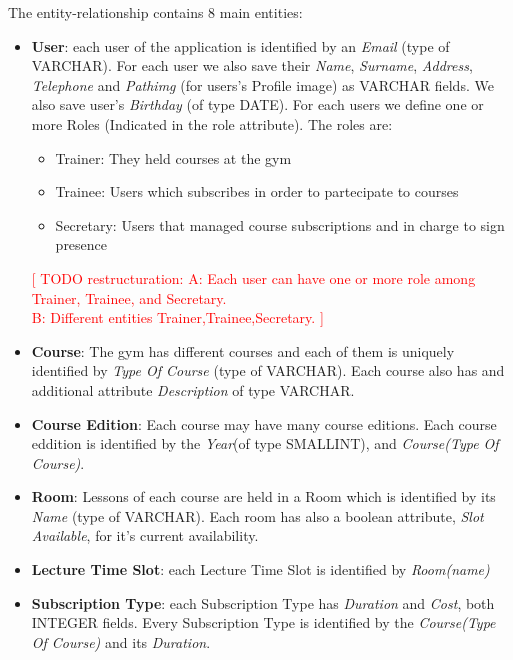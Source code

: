     The entity-relationship contains 8 main entities:
    \begin{itemize}
        \item 
        \textbf{User}: each user of the application is identified by an \textit{Email} (type of VARCHAR). 
    	For each user we also save their \textit{Name}, \textit{Surname}, \textit{Address}, \textit{Telephone} and \textit{Path\textunderscore img} (for users's Profile image) as VARCHAR fields. We also save user's \textit{Birthday} (of type DATE). For each users we define
        one or more Roles (Indicated in the role attribute). The roles are:
        \begin{itemize}
	    \item Trainer: They held courses at the gym 
    	\item Trainee: Users which subscribes in order to partecipate to courses
        \item Secretary: Users that managed course subscriptions and in charge to sign presence
        
        \end{itemize}
    	\textcolor{red}{[ TODO restructuration: A: Each user can have one or more role among Trainer,  Trainee, and Secretary.\\
    	  B: Different entities Trainer,Trainee,Secretary. ]}
    	
    	\item 
    	\textbf{Course}: The gym has different courses and each of them is uniquely identified by 
    	\textit{Type Of Course} (type of VARCHAR). Each course also has and additional attribute \textit{Description} of type VARCHAR.
    	
    	\item 
    	\textbf{Course Edition}: Each course may have many course editions. Each course eddition is identified by the \textit{Year}(of type SMALLINT), and \textit{Course(Type Of Course)}.
    	
    	\item 
    	\textbf{Room}: Lessons of each course are held in a Room which is identified by its \textit{Name} (type of VARCHAR). Each room has also a boolean attribute, \textit{Slot Available}, for it's current availability.
    	
    	\item \textbf{Lecture Time Slot}: each Lecture Time Slot is identified by \textit{Room(name)}
    	
    	\item \textbf{Subscription Type}: each Subscription Type has \textit{Duration} and \textit{Cost}, both INTEGER fields. Every Subscription Type is identified by the \textit{Course(Type Of Course)} and its \textit{Duration}.
    	

\end{itemize}
